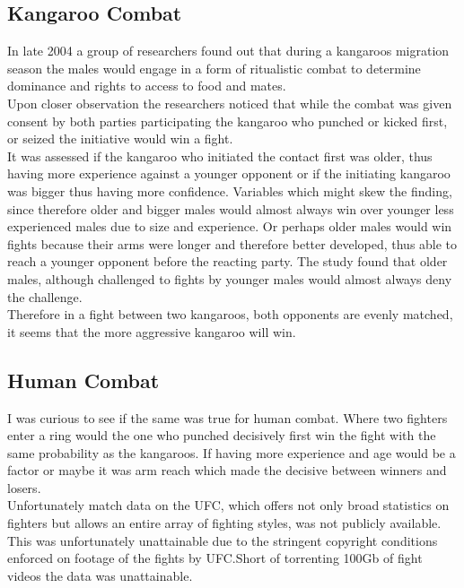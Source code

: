 \documentclass{article}
\begin{document}
\subsection{Kangaroo Combat }
In late 2004 a group of researchers found out that during a kangaroos migration season the males would engage in a form of ritualistic combat to determine dominance and rights to access to food and mates.\cite{one} \\
Upon closer observation the researchers noticed that while the combat was given consent by both parties participating the kangaroo who punched or kicked first, or seized the initiative would win a fight.\\
It was assessed if the kangaroo who initiated the contact first was older, thus having more experience against a younger opponent or if the initiating kangaroo was bigger thus having more confidence. Variables which might skew the finding, since therefore older and bigger males would almost always win over younger less experienced males due to size and experience. Or perhaps older males would win fights because their arms were longer and therefore better developed, thus able to reach a younger opponent before the reacting party.
The study found that older males, although challenged to fights by younger males would almost always deny the challenge.\cite{one}\\
Therefore in a fight between two kangaroos, both opponents are evenly matched, it seems that the more aggressive kangaroo will win.



\subsection{Human Combat }


I was curious to see if the same was true for human combat. Where two fighters enter a ring would the one who punched decisively first win the fight with the same probability as the kangaroos. If having more experience and age would be a factor or maybe it was arm reach which made the decisive between winners and losers.\\
Unfortunately match data on the UFC, which offers not only broad statistics on fighters but allows an entire array of fighting styles, was not publicly available. This was unfortunately unattainable due to the stringent copyright conditions enforced on footage of the fights by UFC.Short of torrenting 100Gb of fight videos the data was unattainable.\\
\end{document}
